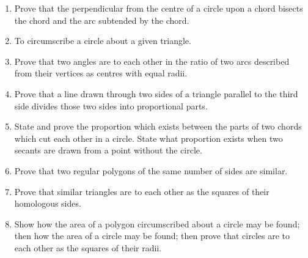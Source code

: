 \documentclass[11pt]{article}
\begin{document}
\begin{enumerate}[series=geo, itemindent=-0.2cm]
    \item Prove that the perpendicular from the centre of a circle upon a chord bisects the chord and the arc subtended by the chord. \vfill

    \item To circumscribe a circle about a given triangle. \vfill
    
    \item Prove that two angles are to each other in the ratio of two arcs described from their vertices as centres with equal radii. \vfill
    
    \item Prove that a line drawn through two sides of a triangle parallel to the third side divides those two sides into proportional parts. \vfill
    
    \item State and prove the proportion which exists between the parts of two chords which cut each other in a circle. State what proportion exists when two secants are drawn from a point without the circle. \vfill
    
    \item Prove that two regular polygons of the same number of sides are similar. \vfill
    
    \item Prove that similar triangles are to each other as the squares of their homologous sides. \vfill
    
    \item Show how the area of a polygon circumscribed about a circle may be found; then how the area of a circle may be found; then prove that circles are to each other as the squares of their radii. \vfill
\end{enumerate}

\newpage

\thispagestyle{empty}
\theendnotes 
\end{document}
